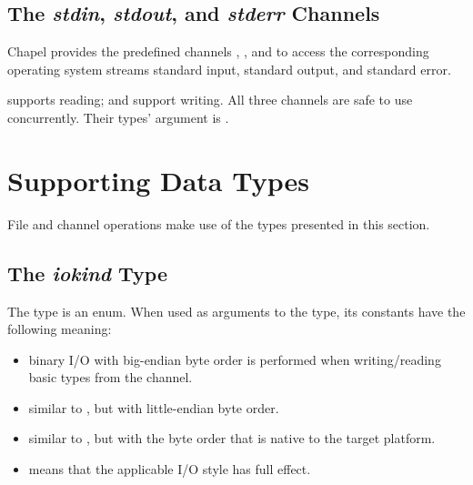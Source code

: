 \subsection{The {\em stdin}, {\em stdout}, and {\em stderr} Channels}
\label{IO_std_channels}

Chapel provides the predefined channels , ,
and  to access the corresponding operating system streams
standard input, standard output, and standard error.

 supports reading;
 and  support writing.
All three channels are safe to use concurrently.
Their types'  argument is .


\section{Supporting Data Types}
\label{IO_data_types}

File and channel operations make use of the types presented in this section.


\subsection{The {\em iokind} Type}
\label{IO_iokind_type}

The  type is an enum. When used
as arguments to the  type,
its constants have the following meaning:

\begin{itemize}

\item {} binary I/O with big-endian byte order
      is performed when writing/reading basic types from the channel.

\item {} similar to , but with little-endian byte order.

\item {} similar to , but with the byte order
      that is native to the target platform.

\item {} means that the applicable I/O style
      has full effect.

\end{itemize}

